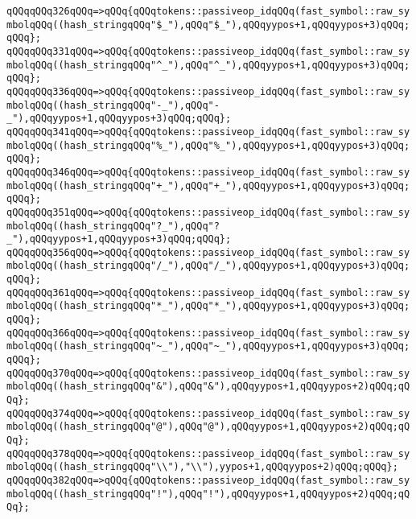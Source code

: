 \verb|qQQqqQQq326qQQq=>qQQq{qQQqtokens::passiveop_idqQQq(fast_symbol::raw_symbolqQQq((hash_stringqQQq"$_"),qQQq"$_"),qQQqyypos+1,qQQqyypos+3)qQQq;qQQq};|\newline
\verb|qQQqqQQq331qQQq=>qQQq{qQQqtokens::passiveop_idqQQq(fast_symbol::raw_symbolqQQq((hash_stringqQQq"^_"),qQQq"^_"),qQQqyypos+1,qQQqyypos+3)qQQq;qQQq};|\newline
\verb|qQQqqQQq336qQQq=>qQQq{qQQqtokens::passiveop_idqQQq(fast_symbol::raw_symbolqQQq((hash_stringqQQq"-_"),qQQq"-_"),qQQqyypos+1,qQQqyypos+3)qQQq;qQQq};|\newline
\verb|qQQqqQQq341qQQq=>qQQq{qQQqtokens::passiveop_idqQQq(fast_symbol::raw_symbolqQQq((hash_stringqQQq"%_"),qQQq"%_"),qQQqyypos+1,qQQqyypos+3)qQQq;qQQq};|\newline
\verb|qQQqqQQq346qQQq=>qQQq{qQQqtokens::passiveop_idqQQq(fast_symbol::raw_symbolqQQq((hash_stringqQQq"+_"),qQQq"+_"),qQQqyypos+1,qQQqyypos+3)qQQq;qQQq};|\newline
\verb|qQQqqQQq351qQQq=>qQQq{qQQqtokens::passiveop_idqQQq(fast_symbol::raw_symbolqQQq((hash_stringqQQq"?_"),qQQq"?_"),qQQqyypos+1,qQQqyypos+3)qQQq;qQQq};|\newline
\verb|qQQqqQQq356qQQq=>qQQq{qQQqtokens::passiveop_idqQQq(fast_symbol::raw_symbolqQQq((hash_stringqQQq"/_"),qQQq"/_"),qQQqyypos+1,qQQqyypos+3)qQQq;qQQq};|\newline
\verb|qQQqqQQq361qQQq=>qQQq{qQQqtokens::passiveop_idqQQq(fast_symbol::raw_symbolqQQq((hash_stringqQQq"*_"),qQQq"*_"),qQQqyypos+1,qQQqyypos+3)qQQq;qQQq};|\newline
\verb|qQQqqQQq366qQQq=>qQQq{qQQqtokens::passiveop_idqQQq(fast_symbol::raw_symbolqQQq((hash_stringqQQq"~_"),qQQq"~_"),qQQqyypos+1,qQQqyypos+3)qQQq;qQQq};|\newline
\verb|qQQqqQQq370qQQq=>qQQq{qQQqtokens::passiveop_idqQQq(fast_symbol::raw_symbolqQQq((hash_stringqQQq"&"),qQQq"&"),qQQqyypos+1,qQQqyypos+2)qQQq;qQQq};|\newline
\verb|qQQqqQQq374qQQq=>qQQq{qQQqtokens::passiveop_idqQQq(fast_symbol::raw_symbolqQQq((hash_stringqQQq"@"),qQQq"@"),qQQqyypos+1,qQQqyypos+2)qQQq;qQQq};|\newline
\verb|qQQqqQQq378qQQq=>qQQq{qQQqtokens::passiveop_idqQQq(fast_symbol::raw_symbolqQQq((hash_stringqQQq"\\"),"\\"),yypos+1,qQQqyypos+2)qQQq;qQQq};|\newline
\verb|qQQqqQQq382qQQq=>qQQq{qQQqtokens::passiveop_idqQQq(fast_symbol::raw_symbolqQQq((hash_stringqQQq"!"),qQQq"!"),qQQqyypos+1,qQQqyypos+2)qQQq;qQQq};|\newline
